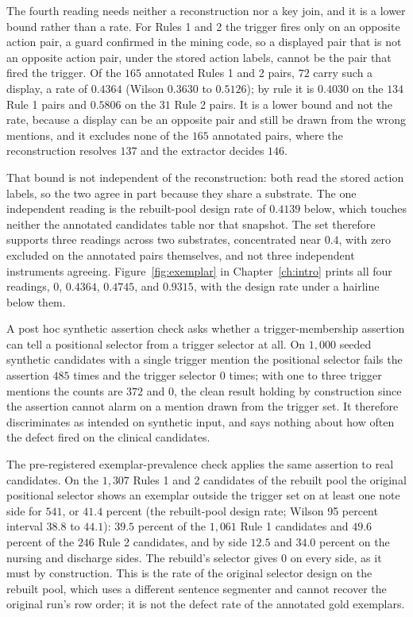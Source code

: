 The fourth reading needs neither a reconstruction nor a key join, and it is a lower
bound rather than a rate. For Rules 1 and 2 the trigger fires only on an opposite
action pair, a guard confirmed in the mining code, so a displayed pair that is not an
opposite action pair, under the stored action labels, cannot be the pair that fired the
trigger. Of the $165$ annotated Rules 1 and 2 pairs, $72$ carry such a display, a rate
of $0.4364$ (Wilson $0.3630$ to $0.5126$); by rule it is $0.4030$ on the $134$ Rule 1 pairs and $0.5806$ on the $31$ Rule 2
pairs. It is a lower bound and not the rate, because a display can be an opposite pair
and still be drawn from the wrong mentions, and it excludes none of the $165$ annotated
pairs, where the reconstruction resolves $137$ and the extractor decides $146$.

That bound is not independent of the reconstruction: both read the stored action labels, so
the two agree in part because they share a substrate. The one independent reading is the
rebuilt-pool design rate of $0.4139$ below, which touches neither the annotated candidates
table nor that snapshot. The set therefore supports three readings across two substrates,
concentrated near $0.4$, with zero excluded on the annotated pairs themselves, and not three
independent instruments agreeing. Figure~\ref{fig:exemplar} in Chapter~\ref{ch:intro} prints all four readings,
$0$, $0.4364$, $0.4745$, and $0.9315$, with the design rate under a hairline below them.

A post hoc synthetic assertion check asks whether a trigger-membership assertion can tell a
positional selector from a trigger selector at all. On $1{,}000$ seeded synthetic candidates with a
single trigger mention the positional selector fails the assertion $485$ times and the trigger
selector $0$ times; with one to three trigger mentions the counts are $372$ and $0$, the clean
result holding by construction since the assertion cannot alarm on a mention drawn from the trigger
set. It therefore discriminates as intended on synthetic input, and says nothing about how often
the defect fired on the clinical candidates.

The pre-registered exemplar-prevalence check applies the same assertion to real candidates.
On the $1{,}307$ Rules 1 and 2 candidates of the rebuilt pool the original positional
selector shows an exemplar outside the trigger set on at least one note side for $541$, or
$41.4$ percent (the rebuilt-pool design rate; Wilson 95 percent interval $38.8$ to $44.1$):
$39.5$ percent of the $1{,}061$ Rule 1 candidates and $49.6$ percent of the $246$ Rule 2
candidates, and by side $12.5$ and $34.0$ percent on the nursing and discharge sides. The rebuild's selector gives $0$ on every
side, as it must by construction. This is the rate of the original selector design on the rebuilt
pool, which uses a different sentence segmenter and cannot recover the original run's row order;
it is not the defect rate of the annotated gold exemplars.

